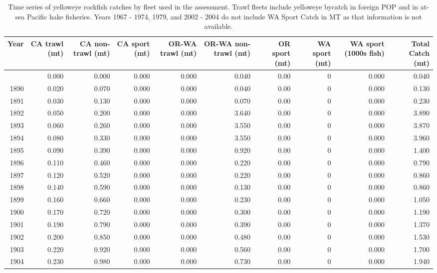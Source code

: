 \documentclass[
]{scrartcl}
\begin{document}
\begin{longtable}{rrrrrrrrrr}

\caption{\label{tbl-all_removals}Time series of yelloweye rockfish
catches by fleet used in the assessment. Trawl fleets include yelloweye
bycatch in foreign POP and in at-sea Pacific hake fisheries. Years 1967
- 1974, 1979, and 2002 - 2004 do not include WA Sport Catch in MT as
that information is not available.}

\tabularnewline

\toprule
Year & CA trawl (mt) & CA non-trawl (mt) & CA sport (mt) & OR-WA trawl (mt) & OR-WA non-trawl (mt) & OR sport (mt) & WA sport (mt) & WA sport (1000s fish) & Total Catch (mt) \\ 
\midrule\addlinespace[2.5pt]
1889 & 0.000 & 0.000 & 0.000 & 0.000 & 0.040 & 0.00 & 0 & 0.000 & 0.040 \\ 
1890 & 0.020 & 0.070 & 0.000 & 0.000 & 0.040 & 0.00 & 0 & 0.000 & 0.130 \\ 
1891 & 0.030 & 0.130 & 0.000 & 0.000 & 0.070 & 0.00 & 0 & 0.000 & 0.230 \\ 
1892 & 0.050 & 0.200 & 0.000 & 0.000 & 3.640 & 0.00 & 0 & 0.000 & 3.890 \\ 
1893 & 0.060 & 0.260 & 0.000 & 0.000 & 3.550 & 0.00 & 0 & 0.000 & 3.870 \\ 
1894 & 0.080 & 0.330 & 0.000 & 0.000 & 3.550 & 0.00 & 0 & 0.000 & 3.960 \\ 
1895 & 0.090 & 0.390 & 0.000 & 0.000 & 0.920 & 0.00 & 0 & 0.000 & 1.400 \\ 
1896 & 0.110 & 0.460 & 0.000 & 0.000 & 0.220 & 0.00 & 0 & 0.000 & 0.790 \\ 
1897 & 0.120 & 0.520 & 0.000 & 0.000 & 0.220 & 0.00 & 0 & 0.000 & 0.860 \\ 
1898 & 0.140 & 0.590 & 0.000 & 0.000 & 0.130 & 0.00 & 0 & 0.000 & 0.860 \\ 
1899 & 0.160 & 0.660 & 0.000 & 0.000 & 0.230 & 0.00 & 0 & 0.000 & 1.050 \\ 
1900 & 0.170 & 0.720 & 0.000 & 0.000 & 0.300 & 0.00 & 0 & 0.000 & 1.190 \\ 
1901 & 0.190 & 0.790 & 0.000 & 0.000 & 0.390 & 0.00 & 0 & 0.000 & 1.370 \\ 
1902 & 0.200 & 0.850 & 0.000 & 0.000 & 0.480 & 0.00 & 0 & 0.000 & 1.530 \\ 
1903 & 0.220 & 0.920 & 0.000 & 0.000 & 0.560 & 0.00 & 0 & 0.000 & 1.700 \\ 
1904 & 0.230 & 0.980 & 0.000 & 0.000 & 0.730 & 0.00 & 0 & 0.000 & 1.940 \\ 

\end{longtable}
\end{document}
